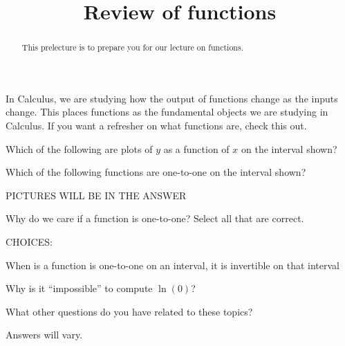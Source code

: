 \documentclass{ximera}
\title{Review of functions}
\begin{document}
\begin{abstract}
This prelecture is to prepare you for our lecture on functions.
\end{abstract}
\maketitle

In Calculus, we are studying how the output of functions change as the
inputs change. This places functions as the fundamental objects we are
studying in Calculus. If you want a refresher on what functions are,
check this
out.



\begin{question}
Which of the following are plots of $y$ as a function of $x$ on the
interval shown?
\begin{solution}

\end{solution}
\end{question}

\begin{question}
Which of the following functions are one-to-one on the interval shown?

PICTURES WILL BE IN THE ANSWER

\end{question}

\begin{question}
Why do we care if a function is one-to-one? Select all that are
correct.

CHOICES:

When is a function is one-to-one on an interval, it is invertible on
that interval

\end{question}

\begin{question}
Why is it ``impossible'' to compute $\ln(0)$?
\end{question}

\begin{question}
What other questions do you have related to these topics?
\begin{solution}
\begin{freeResponse}
Answers will vary.
\end{freeResponse}
\end{solution}
\end{question}
\end{document}
